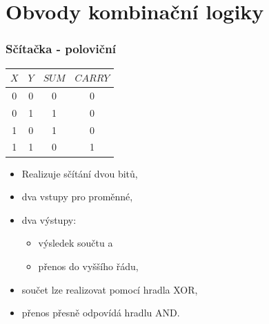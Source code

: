 \section{\texorpdfstring{Obvody kombinační logiky}{Obvody kombinacni logiky}}

	\begin{frame}
    \frametitle{Sčítačka - poloviční}
		
		\begin{minipage}[t][\textheight][t]{0.45\textwidth}
		\vspace{10mm}
		\begin{center}
			\begin{tabular}{ c c | c c }
				$X$ & $Y$ & $SUM$ & $CARRY$\\
				\hline
				0 & 0 & 0 & 0 \\
				0 & 1 & 1 & 0 \\
				1 & 0 & 1 & 0 \\
				1 & 1 & 0 & 1 \\
			\end{tabular}
		\end{center}

		\end{minipage}
		\begin{minipage}[t][\textheight][t]{0.45\textwidth}
    \vspace{10mm}
		
			\begin{itemize}
				\item Realizuje sčítání dvou bitů,
				\item dva vstupy pro proměnné,
				\item dva výstupy:
				
				\begin{itemize}
					\item výsledek součtu a
					\item přenos do vyššího řádu,
				\end{itemize}
				
				\item součet lze realizovat pomocí hradla XOR,
				\item přenos přesně odpovídá hradlu AND.
			\end{itemize}

		\end{minipage}
		
	\end{frame}
	
